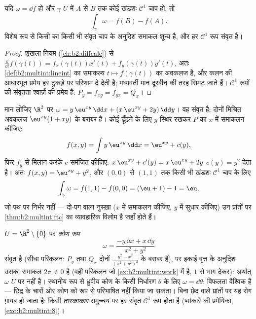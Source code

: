 \begin{theorem}[रेखा समाकलों के लिए आधारभूत
प्रमेय]\label{thm:b2:multint:ftc}
यदि $\omega = \dd f$  हो और $\gamma$ $U$ में $A$ से $B$ तक कोई खंडशः $\mathcal{C}^1$ चाप
हो, तो
\[
\int_\gamma \omega = f(B) - f(A) .
\]
विशेष रूप से किसी  का किसी भी संवृत चाप के अनुदिश समाकल
शून्य है, और हर  $\mathcal{C}^1$ रूप संवृत है।
\end{theorem}

\begin{proof}
शृंखला नियम (\cref{ch:b2:diffcalc}) से $\frac{\dd}{\dd t}f(\gamma(t)) = f_x(\gamma(t))x'(t) +
f_y(\gamma(t))y'(t)$, अतः \cref{def:b2:multint:lineint} का समाकल्य $t \mapsto
f(\gamma(t))$ का अवकलज है, और
कलन की आधारभूत प्रमेय हर टुकड़े पर परिणाम दे देती है; मध्यवर्ती मान
दूरबीन की तरह सिमट जाते हैं।  $\mathcal{C}^1$ रूपों की संवृतता श्वार्ज़
की प्रमेय है: $P_y =
f_{xy} = f_{yx} = Q_x$।
\end{proof}

\begin{example}[किसी विभव का पुनर्निर्माण]\label{ex:b2:multint:potential}
मान लीजिए $\R^2$ पर $\omega = y\,\eu^{xy}\,\dd x + (x\,\eu^{xy} + 2y)\,\dd y$। वह संवृत है: दोनों मिश्रित अवकलज $\eu^{xy}(1 + xy)$ के
बराबर हैं। कोई  ढूँढ़ने के लिए $y$ स्थिर रखकर $P$ का $x$ में
समाकलन कीजिए:
\[
f(x, y) = \int y\,\eu^{xy}\,\dd x = \eu^{xy} + c(y),
\]
फिर $f_y$ से मिलान करके $c$ समंजित कीजिए: $x\,\eu^{xy} + c'(y) =
x\,\eu^{xy} + 2y$ $c(y) = y^2$ देता है। अतः
$f(x,y) = \eu^{xy} +
y^2$, और $(0,0)$ से $(1,1)$ तक किसी भी खंडशः $\mathcal C^1$ चाप के लिए
\[
\int_\gamma\omega = f(1,1) - f(0,0) = (\eu + 1) - 1 = \eu ,
\]
जो पथ पर निर्भर नहीं --- दो-पग वाला नुस्ख़ा ($x$ में समाकलन कीजिए,
$y$ में सुधार कीजिए) उन प्रांतों पर \cref{thm:b2:multint:ftc} का व्यावहारिक विलोम है
जहाँ   होते हैं।
\end{example}

\begin{example}[संवृत होने से यथातथ होना नहीं निकलता]\label{ex:b2:multint:angleform}
$U = \R^2 \setminus \{0\}$ पर \emph{कोण रूप}
\[
\omega = \frac{-y\,\dd x + x\,\dd y}{x^2 + y^2}
\]
संवृत है (सीधा परिकलन: $P_y$ तथा $Q_x$ दोनों $\frac{y^2 - x^2}{(x^2+y^2)^2}$ के बराबर हैं), पर
इकाई वृत्त के अनुदिश उसका समाकल $2\pi \neq 0$ है (वही परिकलन जो \cref{ex:b2:multint:work} में है,
$1$ से भाग देकर): अर्थात् $\omega$ $U$ पर  नहीं है। स्थानीय रूप
से ध्रुवीय कोण के किसी निर्धारण $\theta$ के लिए $\omega = \dd\theta$; विफलता वैश्विक
है --- छिद्र के चारों ओर कोण को  रूप से परिभाषित नहीं किया जा
सकता। बिना छेद वाले प्रांतों पर यह रोग ग़ायब हो जाता है: किसी
\emph{तारकाकार}  समुच्चय पर हर संवृत $\mathcal{C}^1$ रूप  होता है
(प्वांकारे की प्रमेयिका, \cref{exo:b2:multint:8})।
\end{example}

